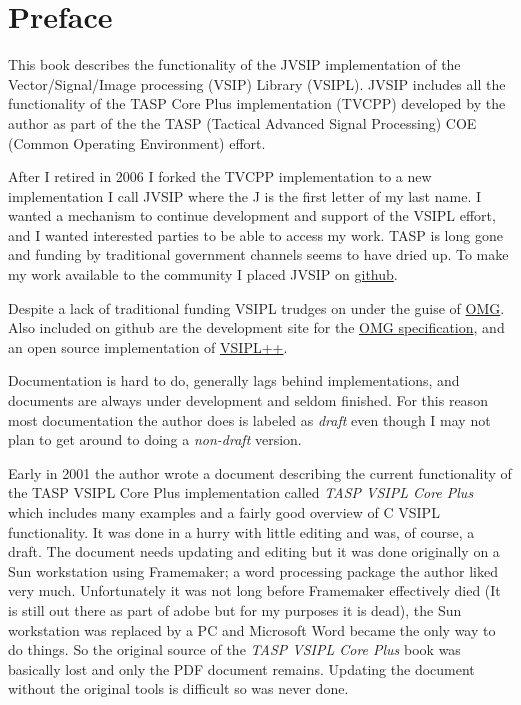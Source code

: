 \chapter{Preface}
This book describes the functionality of the JVSIP implementation of the Vector/Signal/Image processing (VSIP) Library (VSIPL).  JVSIP includes all the functionality of the TASP Core Plus implementation (TVCPP) developed by the author as part of the the TASP (Tactical Advanced Signal Processing) COE (Common Operating Environment) effort.  

After I retired in 2006 I forked the TVCPP implementation to a new implementation I call JVSIP where the J is the first letter of my last name.  I wanted a mechanism to continue development and support of the VSIPL effort, and I wanted interested parties to be able to access my work. TASP is long gone and funding by traditional government channels seems to have dried up. To make my work available to the community I placed JVSIP on  \href{https://github.com/rrjudd/jvsip?}{{github}}. 

Despite a lack of traditional funding VSIPL trudges on under the guise of \href{http://www.omg.org/spec/VSIPL/}{{OMG}}. Also included on github are the development site for the \href{https://github.com/vsip/specs/tree/master/vsipl}{{OMG specification}}, and an open source implementation of \href{https://github.com/openvsip/openvsip}{{VSIPL++}}.  

Documentation is hard to do, generally lags behind implementations, and documents are always under development and seldom finished.  For this reason most documentation the author does is labeled as \emph{draft} even though I may not plan to get around to doing a \emph{non-draft} version.

Early in 2001 the author wrote a document describing the current functionality of the TASP VSIPL Core Plus implementation called \emph{TASP VSIPL Core Plus} which includes many examples and a fairly good overview of C VSIPL functionality. It was done in a hurry with little editing and was, of course, a draft.  The document needs updating and editing but it was done originally on a Sun workstation using Framemaker; a word processing package the author liked very much. Unfortunately it was not long before Framemaker effectively died (It is still out there as part of adobe but for my purposes it is dead), the Sun workstation was replaced by a PC and Microsoft Word became the only way to do things. So the original source of the \emph{TASP VSIPL Core Plus} book was basically lost and only the PDF document remains.  Updating the document without the original tools is difficult so was never done.

